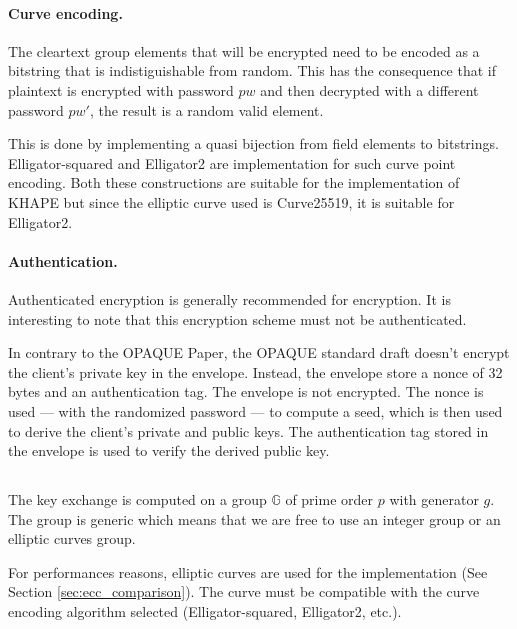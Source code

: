 \documentclass[../report.tex]{subfiles}
\begin{document}
\paragraph{Curve encoding.}
The cleartext group elements that will be encrypted need to be encoded as a bitstring that is indistiguishable from random. This has the consequence that if plaintext is encrypted with password $pw$ and then decrypted with a different password $pw'$, the result is a random valid element.



This is done by implementing a quasi bijection from field elements to bitstrings.
Elligator-squared \cite{Elligator_Squared_Paper} and Elligator2 \cite{Elligator2_Paper} are implementation for such curve point encoding.
Both these constructions are suitable for the implementation of KHAPE but since the elliptic curve used is Curve25519, it is suitable for Elligator2.

\paragraph{Authentication.}
Authenticated encryption is generally recommended for encryption.
It is interesting to note that this encryption scheme must not be authenticated. 



In contrary to the OPAQUE Paper, the OPAQUE standard draft doesn't encrypt the client's private key in the envelope.
Instead, the envelope store a nonce of 32 bytes and an authentication tag. The envelope is not encrypted.
The nonce is used --- with the randomized password --- to compute a seed, which is then used to derive the client's private and public keys. The authentication tag stored in the envelope is used to verify the derived public key.





\subsection{}
The key exchange is computed on a group $\mathbb{G}$ of prime order $p$ with generator $g$.
The group is generic which means that we are free to use an integer group or an elliptic curves group.

For performances reasons, elliptic curves are used for the implementation (See Section \ref{sec:ecc_comparison}).
The curve must be compatible with the curve encoding algorithm selected (Elligator-squared, Elligator2, etc.).
\end{document}
